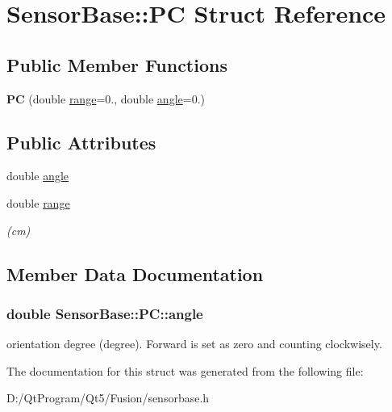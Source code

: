 \hypertarget{struct_sensor_base_1_1_p_c}{}\section{Sensor\+Base\+:\+:P\+C Struct Reference}
\label{struct_sensor_base_1_1_p_c}
\subsection*{Public Member Functions}
\begin{DoxyCompactItemize}
\item 
\hypertarget{struct_sensor_base_1_1_p_c_a819e15c82afbf3c4b067782bad37b121}{}{\bfseries P\+C} (double \hyperlink{struct_sensor_base_1_1_p_c_a886d9de0b686ead3b6a1685b1bbd7304}{range}=0., double \hyperlink{struct_sensor_base_1_1_p_c_aba431354726e699601060c94ff865180}{angle}=0.)\label{struct_sensor_base_1_1_p_c_a819e15c82afbf3c4b067782bad37b121}

\end{DoxyCompactItemize}
\subsection*{Public Attributes}
\begin{DoxyCompactItemize}
\item 
double \hyperlink{struct_sensor_base_1_1_p_c_aba431354726e699601060c94ff865180}{angle}
\item 
\hypertarget{struct_sensor_base_1_1_p_c_a886d9de0b686ead3b6a1685b1bbd7304}{}double \hyperlink{struct_sensor_base_1_1_p_c_a886d9de0b686ead3b6a1685b1bbd7304}{range}\label{struct_sensor_base_1_1_p_c_a886d9de0b686ead3b6a1685b1bbd7304}

\begin{DoxyCompactList}\small\item\em (cm) \end{DoxyCompactList}\end{DoxyCompactItemize}


\subsection{Member Data Documentation}
\hypertarget{struct_sensor_base_1_1_p_c_aba431354726e699601060c94ff865180}{}
\subsubsection[{angle}]{\setlength{\rightskip}{0pt plus 5cm}double Sensor\+Base\+::\+P\+C\+::angle}\label{struct_sensor_base_1_1_p_c_aba431354726e699601060c94ff865180}
orientation degree (degree). Forward is set as zero and counting clockwisely. 

The documentation for this struct was generated from the following file\+:\begin{DoxyCompactItemize}
\item 
D\+:/\+Qt\+Program/\+Qt5/\+Fusion/sensorbase.\+h\end{DoxyCompactItemize}
